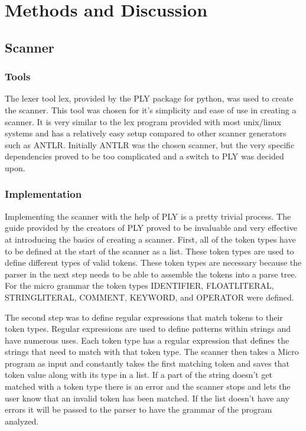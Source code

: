 \documentclass[12pt, oneside]{article}   	%
\begin{document}
\section{Methods and Discussion}
\subsection{Scanner}
\subsubsection{Tools}
The lexer tool lex, provided by the PLY package for python, was used to create the scanner. This tool was chosen for it's simplicity and ease of use in creating a scanner. It is very similar to the lex program provided with most unix/linux systems and has a relatively easy setup compared to other scanner generators such as ANTLR. 
Initially ANTLR was the chosen scanner, but the very specific dependencies proved to be too complicated and a switch to PLY was decided upon. 

\subsubsection{Implementation}
Implementing the scanner with the help of PLY is a pretty trivial process. The guide
provided by the creators of PLY proved to be invaluable and very effective at
introducing the basics of creating a scanner. First, all of the token types have to be defined at the start of the scanner as a
list. These token types are used to define different types of valid tokens. These token types are necessary because the parser in the next step needs to be able to assemble the tokens into a parse tree. For the micro  grammar the token types IDENTIFIER, FLOATLITERAL, STRINGLITERAL, COMMENT, KEYWORD, and OPERATOR were defined.

The second step was to define regular expressions that match tokens to their token types. Regular expressions are used to define patterns within strings and have numerous uses. Each token type has a regular expression that defines the strings that need to match with that token type. The scanner then takes a Micro program as input and constantly takes
the first matching token and saves that token value along with its type in a list. If a part of the string doesn't get matched with a token type there is an error and the scanner stops and lets the user know that an invalid token has been
matched. If the list doesn't have any errors it will be passed to the parser to have the grammar of the program analyzed. 
\end{document}
